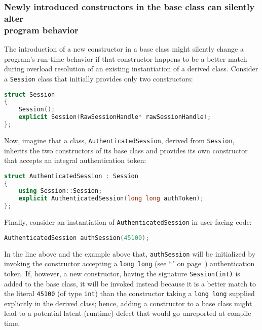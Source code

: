 \subsubsection[Newly introduced constructors in the base class can silently alter program behavior]{Newly introduced constructors in the base class can silently alter\\[0.5ex] program behavior}\label{newly-introduced-constructors-in-the-base-class-can-silently-alter-program-behavior}

The introduction of a new constructor in a base class might silently
change a program's run-time behavior if that constructor happens to be a
better match during overload resolution of an existing instantiation of
a derived class. Consider a \texttt{Session} class that initially provides only two constructors:

\begin{lstlisting}[language=C++]
struct Session
{
    Session();
    explicit Session(RawSessionHandle* rawSessionHandle);
};
\end{lstlisting}
    
\noindent Now, imagine that a class, \texttt{AuthenticatedSession}, derived from
\texttt{Session}, inherits the two constructors of its base class and provides its own constructor that accepts an integral
authentication token:

\begin{lstlisting}[language=C++]
struct AuthenticatedSession : Session
{
    using Session::Session;
    explicit AuthenticatedSession(long long authToken);
};
\end{lstlisting}
    
\noindent Finally, consider an instantiation of \texttt{AuthenticatedSession} in
user-facing code:

\begin{lstlisting}[language=C++]
AuthenticatedSession authSession(45100);
\end{lstlisting}
    
\noindent In the line above and the example above that, \texttt{authSession} will be initialized by
invoking the constructor accepting a \texttt{long}~\texttt{long} (see ``" on page~\pageref{long-long}) authentication token. If, however, a new
constructor, having the signature \texttt{Session(int)} is added to the
base class, it will be invoked instead because it is a better match to the
literal \texttt{45100} (of type \texttt{int}) than the constructor
taking a \texttt{long}~\texttt{long} supplied explicitly in the derived
class; hence, adding a constructor to a base class might lead to a
potential latent (runtime) defect that would go unreported at compile
time.

